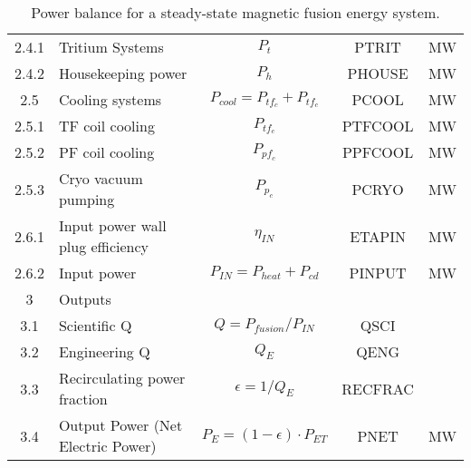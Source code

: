 \begin{table}[ht!]
\begin{tabular}{|c|p{5cm}|c|c|c|}
2.4.1	&	Tritium Systems	&	$P_{{t}}$	&	PTRIT	&	MW \\
2.4.2	&	Housekeeping power	&	$P_{{h}}$	&	PHOUSE	&	MW \\
2.5	&	Cooling systems	&	$P_{{cool}} = P_{{tf}_c} + P_{{tf}_c}$	&	PCOOL	&	MW \\
2.5.1	&	TF coil cooling	&	$P_{{tf}_c}$	&	PTFCOOL	&	MW \\
2.5.2	&	PF coil cooling	&	$P_{{pf}_c}$	&	PPFCOOL	&	MW \\
2.5.3	&	Cryo vacuum pumping	&	$P_{{p}_c}$	&	PCRYO	&	MW \\
2.6.1	& Input power wall plug efficiency &	$\eta_{IN}$ & ETAPIN	&	MW \\
2.6.2	& Input power	& $P_{IN} = P_{heat} + P_{cd}$	&	PINPUT	&	MW \\
\hline								
3	&	Outputs	&		&		&	\\
\hline
3.1	&	Scientific Q	&	$Q = P_{{fusion}}/P_{{IN}}$	&	QSCI	&	\\
3.2	&	Engineering Q	&	$Q_{{E}}$	&	QENG	&	\\
3.3	&	Recirculating power fraction	&	$\epsilon = 1/Q_{{E}}$	&	RECFRAC	&	\\
3.4	&	Output Power (Net Electric Power)	&	$P_{{E}} = (1 - \epsilon) \cdot P_{{ET}}$	&	PNET	&	MW \\
\hline								
\end{tabular}	
\caption{Power balance for a steady-state magnetic fusion energy system.}
\label{tab:powerbalance}
\end{table}






				
